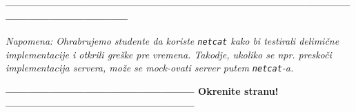 \documentclass[]{article}
\begin{document}
\begin{enumerate}
\vspace{15pt}
\begin{center}
  \textbf{------------------------------------------------------------------------------------------------------------------------------}
\end{center}
\textit{Napomena: Ohrabrujemo studente da koriste \texttt{netcat} kako bi testirali delimi\v{c}ne implementacije i otkrili gre\v{s}ke pre vremena. Takodje, ukoliko se npr. presko\v{c}i implementacija servera, mo\v{z}e se mock-ovati server putem \texttt{netcat}-a.} 
\begin{center}
  \textbf{--------------------------------------------------- Okrenite stranu! ---------------------------------------------------}
\end{center}

\newpage


\end{enumerate}
\end{document}
